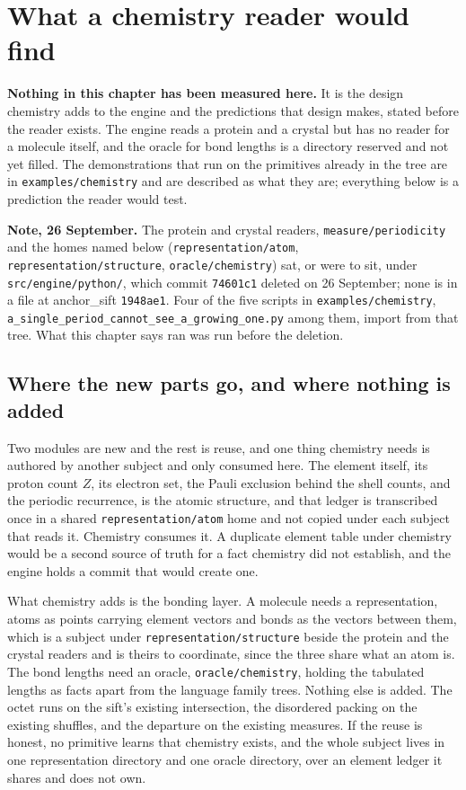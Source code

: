 \chapter{What a chemistry reader would find}

\textbf{Nothing in this chapter has been measured here.} It is the design chemistry adds to the
engine and the predictions that design makes, stated before the reader exists. The engine reads a
protein and a crystal but has no reader for a molecule itself, and the oracle for bond lengths is a
directory reserved and not yet filled. The demonstrations that run on the primitives already in
the tree are in \texttt{examples/chemistry} and are described as what they are; everything below is a
prediction the reader would test.

\textbf{Note, 26 September.} The protein and crystal readers, \texttt{measure/periodicity} and the
homes named below (\texttt{representation/atom}, \texttt{representation/structure},
\texttt{oracle/chemistry}) sat, or were to sit, under \texttt{src/engine/python/}, which commit
\texttt{74601c1} deleted on 26 September; none is in a file at anchor\_sift \texttt{1948ae1}. Four of
the five scripts in \texttt{examples/chemistry}, \texttt{a\_single\_period\_cannot\_see\_a\_growing\_one.py}
among them, import from that tree. What this chapter says ran was run before the deletion.

\section{Where the new parts go, and where nothing is added}

Two modules are new and the rest is reuse, and one thing chemistry needs is authored by another
subject and only consumed here. The element itself, its proton count \(Z\), its electron set, the
Pauli exclusion behind the shell counts, and the periodic recurrence, is the atomic structure, and
that ledger is transcribed once in a shared \texttt{representation/atom} home and not
copied under each subject that reads it. Chemistry consumes it. A duplicate element table under
chemistry would be
a second source of truth for a fact chemistry did not establish, and the engine holds a commit that
would create one.

What chemistry adds is the bonding layer. A molecule needs a representation, atoms as points carrying
element vectors and bonds as the vectors between them, which is a subject under
\texttt{representation/structure} beside the protein and the crystal readers and is theirs to
coordinate, since the three share what an atom is. The bond lengths need an oracle,
\texttt{oracle/chemistry}, holding the tabulated lengths as facts apart from the language family
trees. Nothing else is added. The octet runs on the sift's existing intersection, the disordered
packing on the existing shuffles, and the departure on the existing measures. If the reuse is honest,
no primitive learns that chemistry exists, and the whole subject lives in one representation directory
and one oracle directory, over an element ledger it shares and does not own.

